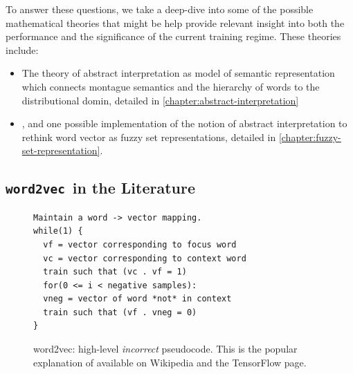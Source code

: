 \documentclass[11pt]{book}
\newcommand{\wtov}{\texttt{word2vec }}
\begin{document}
To answer these questions, we take a deep-dive into some of the possible
mathematical theories that might be help provide relevant insight into both the
performance and the significance of the current training regime. These theories
include:
\begin{itemize}
  \item The theory of abstract interpretation as model of semantic
    representation which connects montague semantics and the hierarchy of words
    to the distributional domin, detailed  in
    \autoref{chapter:abstract-interpretation}
  \item , and one possible implementation of the notion of abstract
    interpretation to rethink word vector as fuzzy set representations, detailed
    in \autoref{chapter:fuzzy-set-representation}.
\end{itemize}

\subsection{\wtov in the Literature}

\begin{figure}[htb]
\begin{verbatim}
Maintain a word -> vector mapping.
while(1) {
  vf = vector corresponding to focus word
  vc = vector corresponding to context word
  train such that (vc . vf = 1)
  for(0 <= i < negative samples):
  vneg = vector of word *not* in context
  train such that (vf . vneg = 0)
}
\end{verbatim}
\caption{word2vec:  high-level \emph{incorrect} pseudocode. This is the popular
    explanation of available on Wikipedia and the TensorFlow page.}
\label{fig:wrong-w2v-pseudocode}
\end{figure}

%
\end{document}
